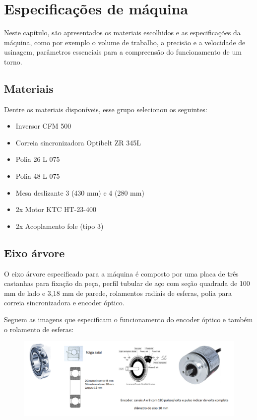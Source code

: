 \newpage
\chapter{Especificações de máquina}

Neste capítulo, são apresentados os materiais escolhidos e as especificações da máquina, como por exemplo o volume de trabalho, a precisão e a velocidade de usinagem, parâmetros essenciais para a compreensão do funcionamento de um torno.

\section{Materiais}

Dentre os materiais disponíveis, esse grupo selecionou os seguintes: 
\begin{itemize}
    \item Inversor CFM 500
    \item Correia sincronizadora Optibelt ZR 345L
    \item Polia 26 L 075 
    \item Polia 48 L 075
    \item Mesa deslizante 3 (430 mm) e 4 (280 mm)
    \item 2x Motor KTC HT-23-400
    \item 2x Acoplamento fole (tipo 3)
\end{itemize}

\section{Eixo árvore}
O eixo árvore especificado para a máquina é composto por uma placa de três castanhas para fixação da peça, perfil tubular de aço com seção quadrada de 100 mm de lado e 3,18 mm de parede, rolamentos radiais de esferas, polia para correia sincronizadora e encoder óptico.

Seguem as imagens que especificam o funcionamento do encoder óptico e também o rolamento de esferas:

\begin{figure}[h!]
    \centering
    \includegraphics[width=\linewidth]{images/rolamentos.png}
    \label{fig:enter-label}
\end{figure}

